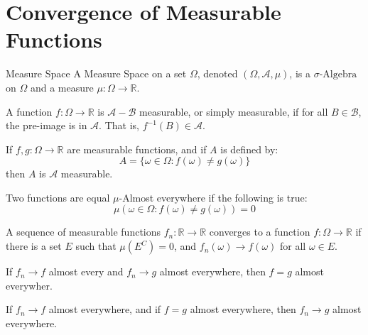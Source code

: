     \section{Convergence of Measurable Functions}
        \begin{ldefinition}{Measure Space}
            A Measure Space on a set $\Omega$, denoted
            $(\Omega,\mathcal{A},\mu)$, is a
            $\sigma\textrm{-Algebra}$ on $\Omega$ and a
            measure $\mu:\Omega\rightarrow\mathbb{R}$.
        \end{ldefinition}
        A function $f:\Omega\rightarrow\mathbb{R}$ is
        $\mathcal{A}-\mathcal{B}$ measurable, or simply
        measurable, if for all $B\in\mathcal{B}$, the
        pre-image is in $\mathcal{A}$. That is,
        $f^{-1}(B)\in\mathcal{A}$.
        \begin{theorem}
            If $f,g:\Omega\rightarrow\mathbb{R}$ are
            measurable functions, and if $A$ is defined by:
            \begin{equation}
                A=\{\omega\in\Omega:f(\omega)\ne{g}(\omega)\}
            \end{equation}
            then $A$ is $\mathcal{A}$ measurable.
        \end{theorem}
        \begin{definition}
            Two functions are equal $\mu$-Almost everywhere
            if the following is true:
            \begin{equation}
                \mu(\omega\in\Omega:f(\omega)\ne{g}(\omega))
                =0
            \end{equation}
        \end{definition}
        \begin{definition}
            A sequence of measurable functions
            $f_{n}:\mathbb{R}\rightarrow\mathbb{R}$ converges
            to a function $f:\Omega\rightarrow\mathbb{R}$
            if there is a set $E$ such that $\mu(E^{C})=0$,
            and $f_{n}(\omega)\rightarrow{f}(\omega)$ for all
            $\omega\in{E}$.
        \end{definition}
        \begin{theorem}
            If $f_{n}\rightarrow{f}$ almost every and
            $f_{n}\rightarrow{g}$ almost everywhere, then
            $f=g$ almost everywher.
        \end{theorem}
        \begin{theorem}
            If $f_{n}\rightarrow{f}$ almost everywhere, and
            if $f=g$ almost everywhere, then
            $f_{n}\rightarrow{g}$ almost everywhere.
        \end{theorem}

